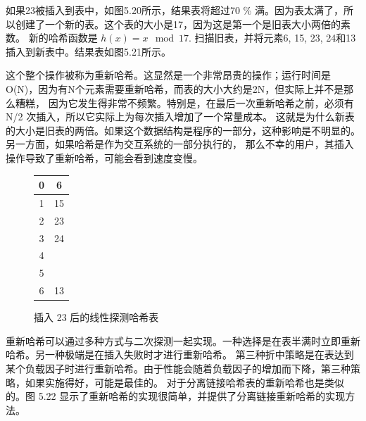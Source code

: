 \documentclass[a4paper]{ctexart}
\theoremstyle{definition}
\theoremstyle{definition}
\begin{document}
如果23被插入到表中，如图5.20所示，结果表将超过70 \% 满。因为表太满了，所以创建了一个新的表。这个表的大小是17，因为这是第一个是旧表大小两倍的素数。
新的哈希函数是 $h(x) = x \mod 17$. 扫描旧表，并将元素6, 15, 23, 24和13插入到新表中。结果表如图5.21所示。

这个整个操作被称为重新哈希。这显然是一个非常昂贵的操作；运行时间是O(N)，因为有N个元素需要重新哈希，而表的大小大约是2N，但实际上并不是那么糟糕，
因为它发生得非常不频繁。特别是，在最后一次重新哈希之前，必须有 N/2 次插入，所以它实际上为每次插入增加了一个常量成本。
这就是为什么新表的大小是旧表的两倍。如果这个数据结构是程序的一部分，这种影响是不明显的。另一方面，如果哈希是作为交互系统的一部分执行的，
那么不幸的用户，其插入操作导致了重新哈希，可能会看到速度变慢。

\begin{figure}[htbp]
    \centering
    \begin{tabular}{|c|c|}
        \hline
        0 & 6 \\
        \hline
        1 & 15 \\
        \hline
        2 & 23 \\
        \hline
        3 & 24 \\
        \hline
        4 &  \\
        \hline
        5 &  \\
        \hline
        6 & 13 \\
        \hline
    \end{tabular}
    \caption{插入 23 后的线性探测哈希表}
    \label{fig:hash_table_2}
\end{figure}

重新哈希可以通过多种方式与二次探测一起实现。一种选择是在表半满时立即重新哈希。另一种极端是在插入失败时才进行重新哈希。
第三种折中策略是在表达到某个负载因子时进行重新哈希。由于性能会随着负载因子的增加而下降，第三种策略，如果实施得好，可能是最佳的。
对于分离链接哈希表的重新哈希也是类似的。图 5.22 显示了重新哈希的实现很简单，并提供了分离链接重新哈希的实现方法。



\end{document}
